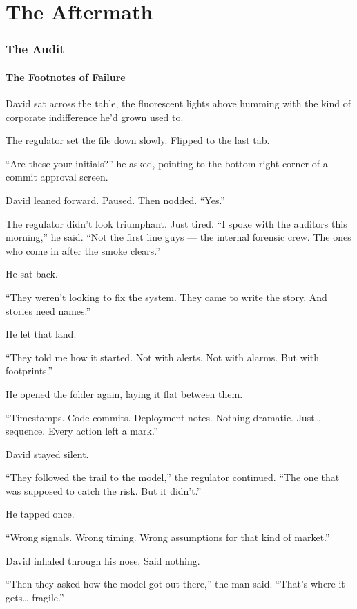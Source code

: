 \part{The Aftermath}

\section{The Audit}

\subsection{The Footnotes of Failure}

David sat across the table, the fluorescent lights above humming with the kind of corporate indifference he’d grown used to.

The regulator set the file down slowly. Flipped to the last tab.

“Are these your initials?” he asked, pointing to the bottom-right corner of a commit approval screen.

David leaned forward. Paused. Then nodded.
“Yes.”

The regulator didn’t look triumphant. Just tired.
“I spoke with the auditors this morning,” he said. “Not the first line guys — the internal forensic crew. The ones who come in after the smoke clears.”

He sat back.

“They weren’t looking to fix the system. They came to write the story. And stories need names.”

He let that land.

“They told me how it started. Not with alerts. Not with alarms. But with footprints.”

He opened the folder again, laying it flat between them.

“Timestamps. Code commits. Deployment notes. Nothing dramatic. Just… sequence. Every action left a mark.”

David stayed silent.

“They followed the trail to the model,” the regulator continued. “The one that was supposed to catch the risk. But it didn’t.”

He tapped once.

“Wrong signals. Wrong timing. Wrong assumptions for that kind of market.”

David inhaled through his nose. Said nothing.

“Then they asked how the model got out there,” the man said. “That’s where it gets… fragile.”

